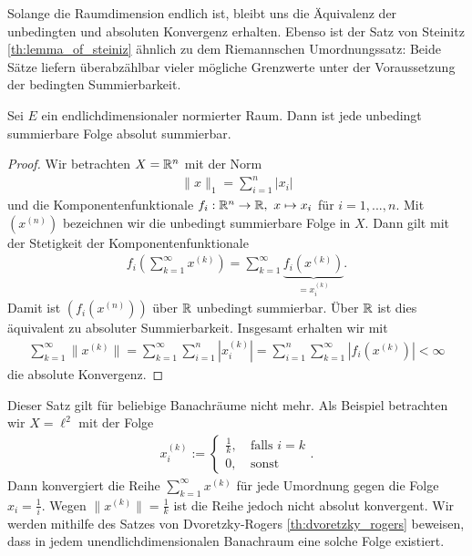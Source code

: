 Solange die Raumdimension endlich ist, bleibt uns die Äquivalenz der unbedingten und absoluten Konvergenz erhalten.
Ebenso ist der Satz von Steinitz \ref{th:lemma_of_steiniz}
ähnlich zu dem Riemannschen Umordnungssatz:
Beide Sätze liefern überabzählbar vieler mögliche Grenzwerte unter der Voraussetzung der bedingten Summierbarkeit.



\begin{sz}\label{th:uncond_implies_absolut_finite_dim}
	Sei $ E $ ein endlichdimensionaler normierter Raum.
	Dann ist jede unbedingt summierbare Folge absolut summierbar.
\end{sz}

\begin{proof}
	Wir betrachten $ X = \mathbb{R}^n $ mit der Norm
	\begin{align*}
		\| x \|_1 = \sum \limits_{i = 1 }^n | x_i |
	\end{align*}
	und die Komponentenfunktionale $ f_i : \mathbb{R}^n \to \mathbb{R}, \ x \mapsto x_i $ für $ i = 1,...,n $. Mit $ (x^{(n)}) $ bezeichnen wir die unbedingt summierbare Folge in $ X $. Dann gilt mit der Stetigkeit der Komponentenfunktionale
	\begin{align*}
		f_i
		\left(
		\sum \limits_{k=1}^\infty x^{(k)}
		\right)
		=
		\sum \limits_{k=1}^\infty \underbrace{f_i(x^{(k)})}_{= x_i^{(k)}}.
	\end{align*}
	Damit ist $ (f_i(x^{(n)})) $ über $ \mathbb{R} $ unbedingt summierbar. Über $ \mathbb{R} $ ist dies äquivalent zu absoluter Summierbarkeit.
	Insgesamt erhalten wir mit
	\begin{align*}
		\sum \limits_{k = 1}^\infty \|x^{(k)} \|
		=
		\sum \limits_{k = 1}^\infty \sum \limits_{i = 1 }^n | x_i^{(k)} |
		=
		\sum \limits_{i = 1}^n \sum \limits_{k = 1 }^\infty | f_i(x^{(k)}) | < \infty
	\end{align*}
	die absolute Konvergenz.
\end{proof}
Dieser Satz gilt für beliebige Banachräume nicht mehr.
Als Beispiel betrachten wir $ X = \ell^2 $ mit der Folge 
\begin{align*}
	x^{(k)}_i := 
	\begin{cases}
		\frac{1}{k}, &\ \text{falls } i = k\\
		0, &\ \text{sonst}
	\end{cases}.
\end{align*}
Dann konvergiert die Reihe $ \sum_{k=1}^\infty x^{(k)} $ für jede Umordnung gegen die Folge $ x_i = \frac{1}{i} $.
Wegen $ \| x^{(k)} \| = \frac{1}{k} $ ist die Reihe jedoch nicht absolut konvergent.
Wir werden mithilfe des Satzes von Dvoretzky-Rogers \ref{th:dvoretzky_rogers} beweisen, dass in jedem unendlichdimensionalen Banachraum eine solche Folge existiert.

